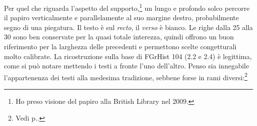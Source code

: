 Per quel che riguarda l'aspetto del
supporto,\footnote{Ho preso visione del papiro alla British Library nel 2009.} un lungo e profondo solco percorre il papiro verticalmente e
parallelamente al suo margine destro, probabilmente segno di una piegatura.
Il testo è sul
\emph{recto}, il
\emph{verso} è bianco. Le righe dalla 25 alla 30 sono ben conservate per la quasi
totale interezza, quindi offrono un buon riferimento per la larghezza delle
precedenti e permettono scelte congetturali molto
calibrate. La
ricostruzione sulla base di FGrHist 104 (2.2 e
2.4) è legittima, come si può notare mettendo i
testi a fronte l'uno dell'altro.
Penso sia innegabile
l'appartenenza dei testi alla medesima tradizione, sebbene
forse in rami diversi:\footnote{Vedi
p.\pageref{bkm:RefHeading690021501267828}.}

